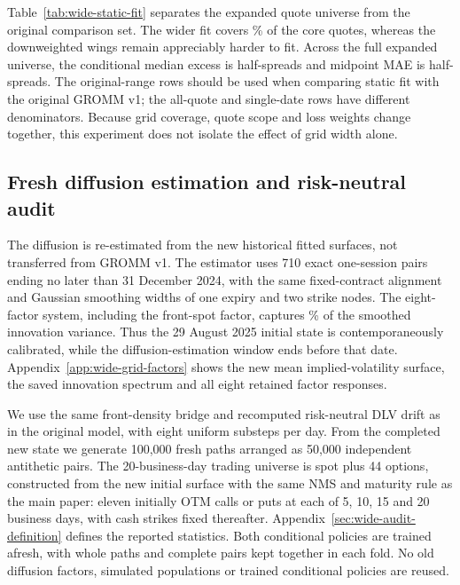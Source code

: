 Table~\ref{tab:wide-static-fit} separates the expanded quote universe from
the original comparison set. The wider fit covers \WideCoreCoverage\% of
the core quotes, whereas the downweighted wings remain appreciably harder
to fit. Across the full expanded universe, the conditional median excess
is \WideOverallConditionalMedian{} half-spreads and midpoint MAE is
\WideOverallMidpointMae{} half-spreads. The original-range rows should be
used when comparing static fit with the original GROMM v1;
the all-quote and single-date rows have different denominators.
Because grid coverage, quote scope and loss weights change together,
this experiment does not isolate the effect of grid width alone.

\subsection{Fresh diffusion estimation and risk-neutral audit}

The diffusion is re-estimated from the new historical fitted surfaces,
not transferred from GROMM v1. The estimator uses 710 exact one-session
pairs ending no later than 31 December 2024, with the same fixed-contract
alignment and Gaussian smoothing widths of one expiry and two strike nodes.
The eight-factor system, including the front-spot factor, captures
\WideExplainedVariance\% of the smoothed innovation variance. Thus the
29 August 2025 initial state is contemporaneously calibrated, while the
diffusion-estimation window ends before that date.
Appendix~\ref{app:wide-grid-factors} shows the new mean implied-volatility
surface, the saved innovation spectrum and all eight retained factor responses.

We use the same front-density bridge and recomputed risk-neutral DLV drift
as in the original model, with eight uniform substeps per day. From the
completed new state we generate 100,000 fresh paths arranged as 50,000
independent antithetic pairs. The 20-business-day trading universe is spot
plus 44 options, constructed from the new initial surface with the same
NMS and maturity rule as the main paper: eleven initially OTM calls or puts
at each of 5, 10, 15 and 20 business days, with cash strikes fixed thereafter.
Appendix~\ref{sec:wide-audit-definition} defines the reported statistics.
Both conditional policies are trained afresh, with whole paths and complete
pairs kept together in each fold. No old diffusion factors, simulated
populations or trained conditional policies are reused.



